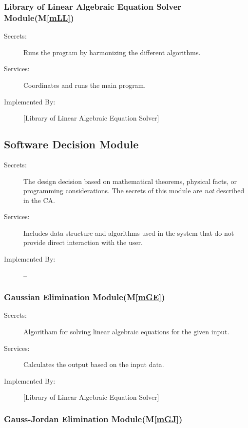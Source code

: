 \documentclass[12pt, titlepage]{article}
\newcommand{\mref}[1]{M\ref{#1}}
\begin{document}
\subsubsection{Library of Linear Algebraic Equation Solver Module(\mref{mLL})}

\begin{description}
\item[Secrets:]Runs the program by harmonizing the different algorithms.
\item[Services:]Coordinates and runs the main program.
\item[Implemented By:] [Library of Linear Algebraic Equation Solver]
\end{description}





\subsection{Software Decision Module}

\begin{description}
\item[Secrets:] The design decision based on mathematical theorems, physical
  facts, or programming considerations. The secrets of this module are
  \emph{not} described in the CA.
\item[Services:] Includes data structure and algorithms used in the system that
  do not provide direct interaction with the user. 
\item[Implemented By:] --
\end{description}

\subsubsection{Gaussian Elimination Module(\mref{mGE})}

\begin{description}
\item[Secrets:]Algoritham for solving linear algebraic equations for the given input.
\item[Services:]Calculates the output based on the input data.
\item[Implemented By:] [Library of Linear Algebraic Equation Solver]
\end{description}

\subsubsection{Gauss-Jordan Elimination Module(\mref{mGJ})}
\end{document}

